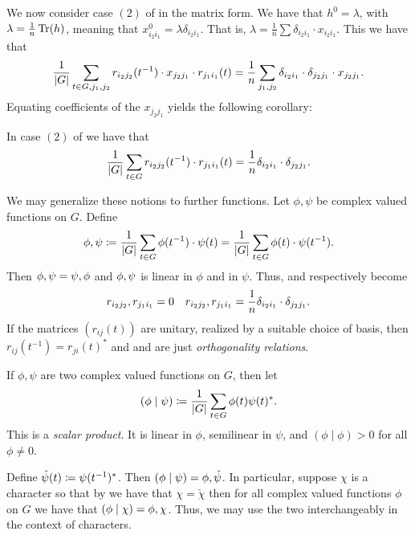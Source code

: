 \documentclass[letterpaper, 11pt, oneside]{book}
\begin{document}
We now consider case $(2)$ of  in the matrix form.
We have that $h^{0} = \lambda$, with $\lambda = \frac{1}{n} \Tr(h)$, meaning that $x_{i_{2}i_{1}}^{0} = \lambda \delta_{i_{2}i_{1}}$.
That is, $\lambda = \frac{1}{n} \sum \delta_{i_{2}i_{1}} \cdot x_{i_{2}i_{1}}$.
This we have that
\[
  \frac{1}{\abs{G}} \sum_{t \in G, j_{1}, j_{2}} r_{i_{2}j_{2}}(t^{-1}) \cdot x_{j_{2}j_{1}} \cdot r_{j_{1}i_{1}}(t) = \frac{1}{n} \sum_{j_{1}, j_{2}} \delta_{i_{2}i_{1}} \cdot \delta_{j_{2}j_{1}} \cdot x_{j_{2}j_{1}}.
\]
Equating coefficients of the $x_{j_{2}j_{1}}$ yields the following corollary:
\begin{cor}\label{cor:schurs_lemma_cor_3}
  In case $(2)$ of  we have that
  \[
    \frac{1}{\abs{G}} \sum_{t \in G} r_{i_{2}j_{2}}(t^{-1}) \cdot r_{j_{1}i_{1}}(t) = \frac{1}{n} \delta_{i_{2}i_{1}} \cdot \delta_{j_{2}j_{1}}.
  \]
\end{cor}

We may generalize these notions to further functions.
Let $\phi, \psi$ be complex valued functions on $G$.
Define
\[
  \inner{\phi , \psi} \defeq \frac{1}{\abs{G}} \sum_{t \in G} \phi(t^{-1}) \cdot \psi(t) = \frac{1}{\abs{G}} \sum_{t \in G} \phi(t) \cdot \psi(t^{-1}).
\]
Then $\inner{\phi , \psi} = \inner{\psi , \phi}$ and $\inner{\phi , \psi}$ is linear in $\phi$ and in $\psi$.
Thus,  and  respectively become
\begin{align*}
  \inner{r_{i_{2}j_{2}}, r_{j_{1}i_{1}}} = 0 && \inner{r_{i_{2}j_{2}}, r_{j_{1}i_{1}}} = \frac{1}{n} \delta_{i_{2}i_{1}} \cdot \delta_{j_{2}j_{1}}.
\end{align*}
If the matrices $(r_{ij}(t))$ are unitary, realized by a suitable choice of basis, then $r_{ij}(t^{-1}) = r_{ji}(t)^{*}$ and  and  are just \emph{orthogonality relations}.

\clearpage

\begin{defn}
  If $\phi, \psi$ are two complex valued functions on $G$, then let
  \[
    (\phi \mid \psi) \coloneqq \frac{1}{\abs{G}} \sum_{t \in G} \phi(t) \psi(t)^{*}.
  \]
  This is a \emph{scalar product}.
  It is linear in $\phi$, semilinear in $\psi$, and $(\phi \mid \phi) > 0$ for all $\phi \neq 0$.
\end{defn}

Define $\check{\psi}(t) \coloneqq \psi(t^{-1})^{*}$.
Then $(\phi \mid \psi) = \inner{\phi, \check{\psi}}$.
In particular, suppose $\chi$ is a character so that by  we have that $\chi = \check{\chi}$ then for all complex valued functions $\phi$ on $G$ we have that $(\phi \mid \chi) = \inner{\phi, \chi}$.
Thus, we may use the two interchangeably in the context of characters.
\end{document}
